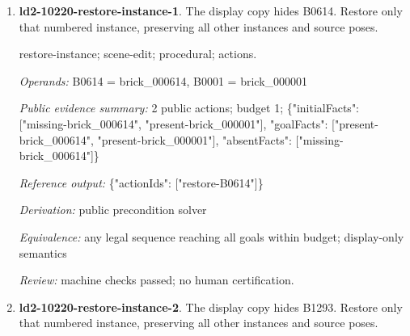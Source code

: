 \begin{enumerate}
\par{\small source-sequence; scene-edit; procedural; actions.\par\textit{Operands:} B0016 = brick\_000016, B0012 = brick\_000012, B0022 = brick\_000022, B0011 = brick\_000011, B0001 = brick\_000001, B0009 = brick\_000009, B0007 = brick\_000007, B0008 = brick\_000008, B0002 = brick\_000002, B0006 = brick\_000006, B0017 = brick\_000017, B0010 = brick\_000010, B0023 = brick\_000023, B0003 = brick\_000003, B0015 = brick\_000015, B0020 = brick\_000020, B0005 = brick\_000005, B0004 = brick\_000004, B0018 = brick\_000018, B0021 = brick\_000021, B0013 = brick\_000013, B0014 = brick\_000014, B0019 = brick\_000019\par\textit{Public evidence summary:} 6 public actions; budget 6; \{"initialFacts": ["start"], "goalFacts": ["done-6"], "absentFacts": []\}\par\textit{Reference output:} \{"actionIds": ["step-1", "step-2", "step-3", "step-4", "step-5", "step-6"]\}\par\textit{Derivation:} public precondition solver\par\textit{Equivalence:} any legal sequence reaching all goals within budget; display-only semantics\par\textit{Review:} machine checks passed; no human certification.}
\item \textbf{ld2-10220-restore-instance-1}. The display copy hides B0614. Restore only that numbered instance, preserving all other instances and source poses.
\par{\small restore-instance; scene-edit; procedural; actions.\par\textit{Operands:} B0614 = brick\_000614, B0001 = brick\_000001\par\textit{Public evidence summary:} 2 public actions; budget 1; \{"initialFacts": ["missing-brick\_000614", "present-brick\_000001"], "goalFacts": ["present-brick\_000614", "present-brick\_000001"], "absentFacts": ["missing-brick\_000614"]\}\par\textit{Reference output:} \{"actionIds": ["restore-B0614"]\}\par\textit{Derivation:} public precondition solver\par\textit{Equivalence:} any legal sequence reaching all goals within budget; display-only semantics\par\textit{Review:} machine checks passed; no human certification.}
\item \textbf{ld2-10220-restore-instance-2}. The display copy hides B1293. Restore only that numbered instance, preserving all other instances and source poses.

\end{enumerate}

